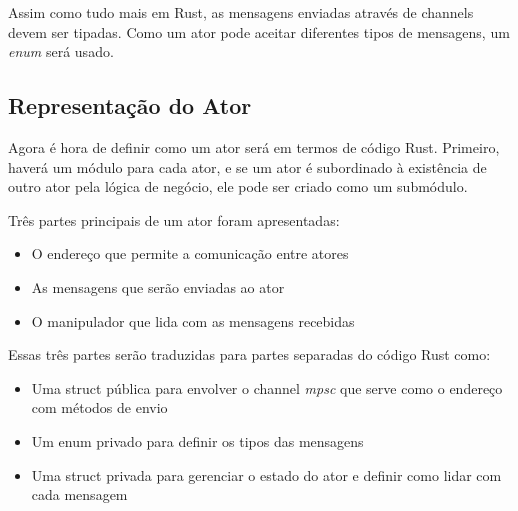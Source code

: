 Assim como tudo mais em Rust, as mensagens enviadas através de channels devem ser tipadas. Como um ator pode aceitar diferentes tipos de mensagens, um \emph{enum} será usado.

\subsection{Representação do Ator}

Agora é hora de definir como um ator será em termos de código Rust. Primeiro, haverá um módulo para cada ator, e se um ator é subordinado à existência de outro ator pela lógica de negócio, ele pode ser criado como um submódulo.

Três partes principais de um ator foram apresentadas:

\begin{itemize}
    \item O endereço que permite a comunicação entre atores
    \item As mensagens que serão enviadas ao ator
    \item O manipulador que lida com as mensagens recebidas
\end{itemize}

Essas três partes serão traduzidas para partes separadas do código Rust como:

\begin{itemize}
    \item Uma struct pública para envolver o channel \emph{mpsc} que serve como o endereço com métodos de envio
    \item Um enum privado para definir os tipos das mensagens
    \item Uma struct privada para gerenciar o estado do ator e definir como lidar com cada mensagem
\end{itemize}
